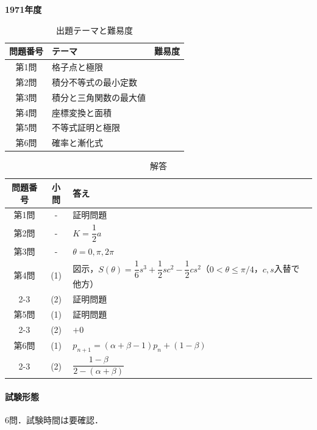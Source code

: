 \documentclass[../../main.tex]{subfiles}
\begin{document}
\begin{center}
  {\fontsize{48pt}{58pt}\selectfont \textbf{1971}\normalsize\textbf{年度}}
\end{center}

\begin{table}[htb]
  \centering
  \caption{出題テーマと難易度}
  \begin{tabular}{|c|p{9cm}|c|}
    \hline
    \textbf{問題番号} & \textbf{テーマ} & \textbf{難易度} \\
    \hline
    第1問 & 格子点と極限 & \\
    \hline
    第2問 & 積分不等式の最小定数 & \\
    \hline
    第3問 & 積分と三角関数の最大値 & \\
    \hline
    第4問 & 座標変換と面積 & \\
    \hline
    第5問 & 不等式証明と極限 & \\
    \hline
    第6問 & 確率と漸化式 & \\
    \hline
  \end{tabular}
\end{table}

\begin{table}[htb]
  \centering
  \caption{解答}
  \renewcommand{\arraystretch}{1.4}
  \begin{tabular}{|c|c|p{9cm}|}
    \hline
    \textbf{問題番号} & \textbf{小問} & \textbf{答え} \\
    \hline
    第1問 & - & 証明問題 \\
    \hline
    第2問 & - & $K=\dfrac{1}{2}a$ \\
    \hline
    第3問 & - & $\theta=0,\pi,2\pi$ \\
    \hline
    第4問 & (1) & 図示，$S(\theta)=\dfrac{1}{6}s^3+\dfrac{1}{2}sc^2-\dfrac{1}{2}cs^2$（$0<\theta\le\pi/4$，$c,s$入替で他方） \\
    \cline{2-3}
    & (2) & 証明問題 \\
    \hline
    第5問 & (1) & 証明問題 \\
    \cline{2-3}
    & (2) & $+0$ \\
    \hline
    第6問 & (1) & $p_{n+1}=(\alpha+\beta-1)p_n+(1-\beta)$ \\
    \cline{2-3}
    & (2) & $\dfrac{1-\beta}{2-(\alpha+\beta)}$ \\
    \hline
  \end{tabular}
\end{table}

\paragraph{試験形態}
6問．試験時間は要確認．
\end{document}
